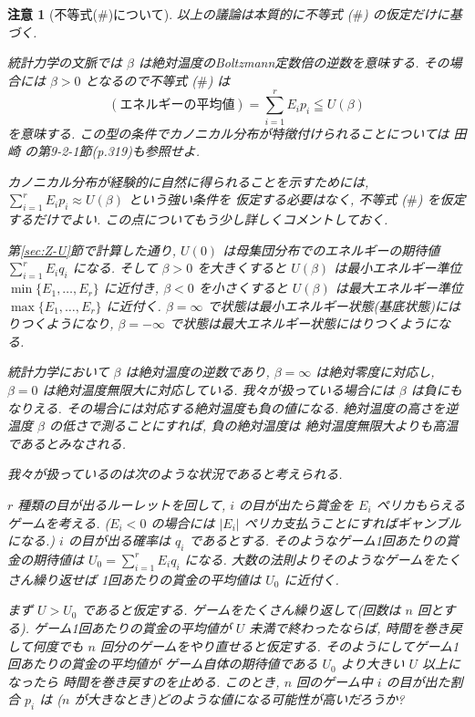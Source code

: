 \documentclass[12pt,twoside]{jarticle}
\theoremstyle{jplain}
\theoremstyle{jplain}
\theoremstyle{jplain}
\newtheorem{remark}[theorem]{注意}
\numberwithin{theorem}{section}
\numberwithin{equation}{section}
\numberwithin{figure}{section}
\numberwithin{table}{section}
\newcommand\secref[1]{第\ref{#1}節}
\begin{document}
\begin{remark}[不等式($\#$)について]
\label{remark:beta}
以上の議論は本質的に不等式 ($\#$) の仮定だけに基づく.

統計力学の文脈では $\beta$ は絶対温度のBoltzmann定数倍の逆数を意味する.
その場合には $\beta>0$ となるので不等式 ($\#$) は
\[
(\text{エネルギーの平均値})=\sum_{i=1}^r E_i p_i\leqq U(\beta)
\]
を意味する.
この型の条件でカノニカル分布が特徴付けられることについては
田崎 \cite{Tasaki}の第9-2-1節(p.319)も参照せよ.

カノニカル分布が経験的に自然に得られることを示すためには,
$\sum_{i=1}^r E_i p_i\approx U(\beta)$ という強い条件を
仮定する必要はなく, 不等式 ($\#$) を仮定するだけでよい.
この点についてもう少し詳しくコメントしておく.

\secref{sec:Z-U}で計算した通り,
$U(0)$ は母集団分布でのエネルギーの期待値 $\sum_{i=1}^r E_i q_i$ になる.
そして $\beta>0$ を大きくすると
$U(\beta)$ は最小エネルギー準位 $\min\{E_1,\ldots,E_r\}$ に近付き,
$\beta<0$ を小さくすると
$U(\beta)$ は最大エネルギー準位 $\max\{E_1,\ldots,E_r\}$ に近付く.
$\beta=\infty$ で状態は最小エネルギー状態(基底状態)にはりつくようになり,
$\beta=-\infty$ で状態は最大エネルギー状態にはりつくようになる.

統計力学において $\beta$ は絶対温度の逆数であり,
$\beta=\infty$ は絶対零度に対応し,
$\beta=0$ は絶対温度無限大に対応している.
我々が扱っている場合には $\beta$ は負にもなりえる.
その場合には対応する絶対温度も負の値になる.
絶対温度の高さを逆温度 $\beta$ の低さで測ることにすれば, 負の絶対温度は
絶対温度無限大よりも高温であるとみなされる.

我々が扱っているのは次のような状況であると考えられる.

$r$ 種類の目が出るルーレットを回して,
$i$ の目が出たら賞金を $E_i$ ペリカもらえるゲームを考える.
($E_i<0$ の場合には $|E_i|$ ペリカ支払うことにすればギャンブルになる.)
$i$ の目が出る確率は $q_i$ であるとする.
そのようなゲーム1回あたりの賞金の期待値は $U_0=\sum_{i=1}^r E_i q_i$ になる.
大数の法則よりそのようなゲームをたくさん繰り返せば
1回あたりの賞金の平均値は $U_0$ に近付く.

まず $U>U_0$ であると仮定する.
ゲームをたくさん繰り返して(回数は $n$ 回とする).
ゲーム1回あたりの賞金の平均値が $U$ 未満で終わったならば,
時間を巻き戻して何度でも $n$ 回分のゲームをやり直せると仮定する.
そのようにしてゲーム1回あたりの賞金の平均値が
ゲーム自体の期待値である $U_0$ より大きい $U$ 以上になったら
時間を巻き戻すのを止める.
このとき, $n$ 回のゲーム中 $i$ の目が出た割合 $p_i$ は
($n$ が大きなとき)どのような値になる可能性が高いだろうか?


\end{remark}
\end{document}
